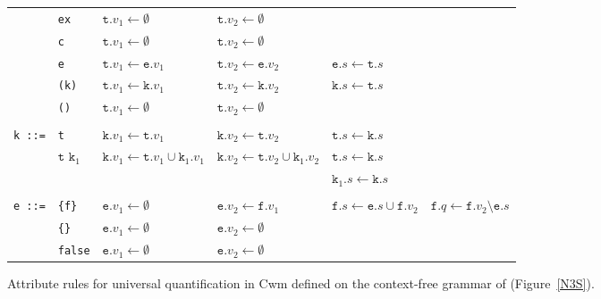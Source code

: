 \begin{sidewaysfigure}
\begin{minipage}{\linewidth}
\begin{center}
\begin{tabular}{llllll}
            & \texttt{ex} &               $\texttt{t}.v_1 \leftarrow \emptyset$&  $\texttt{t}.v_2 \leftarrow\emptyset$& &\\%
      & \texttt{c} &               $\texttt{t}.v_1 \leftarrow\emptyset$&  $\texttt{t}.v_2 \leftarrow\emptyset$& &\\ %
      & \texttt{e} &                $\texttt{t}.v_1 \leftarrow\texttt{e}.v_1 $ &  $\texttt{t}.v_2 \leftarrow\texttt{e}.v_2 $& $\texttt{e}.s\leftarrow \texttt{t}.s$\\
      & \texttt{(k)}& $\texttt{t}.v_1 \leftarrow\texttt{k}.v_1$ &$\texttt{t}.v_2 \leftarrow\texttt{k}.v_2$& $\texttt{k}.s\leftarrow \texttt{t}.s$\\
      & \texttt{()}& $\texttt{t}.v_1 \leftarrow\emptyset$&  $\texttt{t}.v_2 \leftarrow\emptyset$\\
      &&&\\
\texttt{k ::=}& \texttt{t}& $\texttt{k}.v_1 \leftarrow\texttt{t}.v_1$ & $\texttt{k}.v_2 \leftarrow\texttt{t}.v_2$& $\texttt{t}.s\leftarrow \texttt{k}.s$\\
&$\texttt{t k}_1$ & $\texttt{k}.v_1 \leftarrow\texttt{t}.v_1\cup\texttt{k}_1.v_1$ & $\texttt{k}.v_2 \leftarrow\texttt{t}.v_2\cup\texttt{k}_1.v_2$& $\texttt{t}.s\leftarrow \texttt{k}.s$\\
&&&& $\texttt{k}_1.s\leftarrow \texttt{k}.s$\\
&&&\\
\texttt{e ::=}&\texttt{\{f\}} &                $\texttt{e}.v_1 \leftarrow\emptyset$ &  $\texttt{e}.v_2 \leftarrow\texttt{f}.v_1$& $\texttt{f}.s\leftarrow \texttt{e}.s \cup \texttt{f}.v_2$& $\texttt{f}.q \leftarrow \texttt{f}.v_2 \setminus \texttt{e}.s$\\
       &\texttt{\{\}} &  $\texttt{e}.v_1 \leftarrow\emptyset$ &  $\texttt{e}.v_2 \leftarrow\emptyset$\\
       &\texttt{false}       &                $\texttt{e}.v_1 \leftarrow\emptyset$&                $\texttt{e}.v_2 \leftarrow\emptyset$\\
  \hline

\end{tabular}
\end{center}   \normalsize
\caption{Attribute rules for universal quantification in Cwm defined on the context-free grammar of \nthree (Figure~\ref{N3S}).\label{uniatt}}
\end{minipage}
\end{sidewaysfigure}


